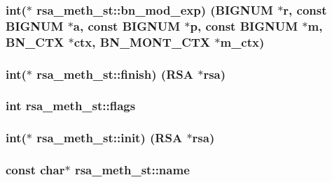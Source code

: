 \subsubsection[{\texorpdfstring{bn\+\_\+mod\+\_\+exp}{bn_mod_exp}}]{\setlength{\rightskip}{0pt plus 5cm}int($\ast$ rsa\+\_\+meth\+\_\+st\+::bn\+\_\+mod\+\_\+exp) ({\bf B\+I\+G\+N\+UM} $\ast$r, const {\bf B\+I\+G\+N\+UM} $\ast$a, const {\bf B\+I\+G\+N\+UM} $\ast$p, const {\bf B\+I\+G\+N\+UM} $\ast$m, {\bf B\+N\+\_\+\+C\+TX} $\ast$ctx, {\bf B\+N\+\_\+\+M\+O\+N\+T\+\_\+\+C\+TX} $\ast$m\+\_\+ctx)}\hypertarget{structrsa__meth__st_a1dc3f40f6072ffed989d7dfedc66cda1}{}\label{structrsa__meth__st_a1dc3f40f6072ffed989d7dfedc66cda1}
\subsubsection[{\texorpdfstring{finish}{finish}}]{\setlength{\rightskip}{0pt plus 5cm}int($\ast$ rsa\+\_\+meth\+\_\+st\+::finish) ({\bf R\+SA} $\ast$rsa)}\hypertarget{structrsa__meth__st_a12aded957112894c6fd832168a380fbc}{}\label{structrsa__meth__st_a12aded957112894c6fd832168a380fbc}
\subsubsection[{\texorpdfstring{flags}{flags}}]{\setlength{\rightskip}{0pt plus 5cm}int rsa\+\_\+meth\+\_\+st\+::flags}\hypertarget{structrsa__meth__st_ab01ea2742087308a50209ccff23832c7}{}\label{structrsa__meth__st_ab01ea2742087308a50209ccff23832c7}
\subsubsection[{\texorpdfstring{init}{init}}]{\setlength{\rightskip}{0pt plus 5cm}int($\ast$ rsa\+\_\+meth\+\_\+st\+::init) ({\bf R\+SA} $\ast$rsa)}\hypertarget{structrsa__meth__st_ac8c394e65dbeda15573657fb550c5fe7}{}\label{structrsa__meth__st_ac8c394e65dbeda15573657fb550c5fe7}
\subsubsection[{\texorpdfstring{name}{name}}]{\setlength{\rightskip}{0pt plus 5cm}const char$\ast$ rsa\+\_\+meth\+\_\+st\+::name}\hypertarget{structrsa__meth__st_a7ce6d4139c1e9e8b220d2d3b3f240a14}{}\label{structrsa__meth__st_a7ce6d4139c1e9e8b220d2d3b3f240a14}
